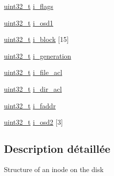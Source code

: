 \begin{DoxyCompactItemize}
\item 
\hyperlink{types_8h_a33594304e786b158f3fb30289278f5af}{uint32\-\_\-t} \hyperlink{structext2__inode_a2037da1edbe1d421dd4453f84cb973e6}{i\-\_\-flags}
\item 
\hyperlink{types_8h_a33594304e786b158f3fb30289278f5af}{uint32\-\_\-t} \hyperlink{structext2__inode_ab06178218f59df43b3d80ad53edc6105}{i\-\_\-osd1}
\item 
\hyperlink{types_8h_a33594304e786b158f3fb30289278f5af}{uint32\-\_\-t} \hyperlink{structext2__inode_a3e2386992eeb6a3b6aa5e282c50221c7}{i\-\_\-block} \mbox{[}15\mbox{]}
\item 
\hyperlink{types_8h_a33594304e786b158f3fb30289278f5af}{uint32\-\_\-t} \hyperlink{structext2__inode_a551df9f3b8f61eb5840eeeb5921c69fb}{i\-\_\-generation}
\item 
\hyperlink{types_8h_a33594304e786b158f3fb30289278f5af}{uint32\-\_\-t} \hyperlink{structext2__inode_aee0fba48998e7d27b836d04ee53e4463}{i\-\_\-file\-\_\-acl}
\item 
\hyperlink{types_8h_a33594304e786b158f3fb30289278f5af}{uint32\-\_\-t} \hyperlink{structext2__inode_a11c2793c33c6ce3f13a5f046e246fd47}{i\-\_\-dir\-\_\-acl}
\item 
\hyperlink{types_8h_a33594304e786b158f3fb30289278f5af}{uint32\-\_\-t} \hyperlink{structext2__inode_a3c921d50835f4869a08444b7e8b01043}{i\-\_\-faddr}
\item 
\hyperlink{types_8h_a33594304e786b158f3fb30289278f5af}{uint32\-\_\-t} \hyperlink{structext2__inode_a6f05264ef1f6a42a6975a858d1aa17c3}{i\-\_\-osd2} \mbox{[}3\mbox{]}
\end{DoxyCompactItemize}


\subsection{\-Description détaillée}
\-Structure of an inode on the disk 

